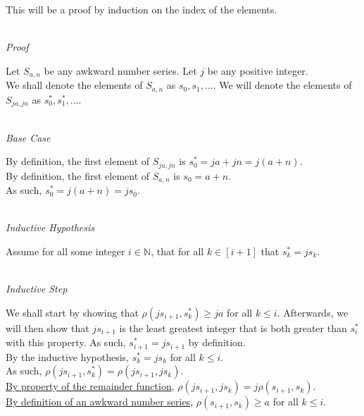 \documentclass[a4paper,12pt]{article}
\begin{document}
\noindent This will be a proof by induction on the index of the elements.

\noindent \\
\textit{Proof}

\noindent Let $S_{a,n}$ be any awkward number series. Let $j$ be any positive integer.\\

\noindent We shall denote the elements of $S_{a,n}$ as $s_0, s_1, ...$. We will denote the elements of $S_{ja, jn}$ as $s^*_0, s^*_1, ...$.

\noindent \\
\textit{Base Case}

\noindent By definition, the first element of $S_{ja, jn}$ is $s^*_0 = ja + jn = j(a + n)$.\\

\noindent By definition, the first element of $S_{a,n}$ is $s_0 = a + n$.\\

\noindent As such, $s^*_0 = j(a + n) = js_0$.



\noindent \\
\textit{Inductive Hypothesis}

\noindent Assume for all some integer $i \in \mathbb{N}$, that for all $k \in [i + 1]$ that $s^*_k = js_k$.


\noindent \\
\textit{Inductive Step}

\noindent We shall start by showing that $\rho(js_{i+1}, s^*_k) \geq ja$ for all $k \leq i$. Afterwards, we will then show that $js_{i+1}$ is the least greatest integer that is both greater than $s^*_i$ with this property. As such, $s^*_{i+1} = js_{i+1}$ by definition.\\

\noindent By the inductive hypothesis, $s^*_k = js_k$ for all $k \leq i$.\\

\noindent As such, $\rho(js_{i+1}, s^*_k) = \rho(js_{i+1}, js_k)$.\\

\noindent \hyperlink{remainder_properties}{By property of the remainder function}, $\rho(js_{i+1}, js_k) = j \rho(s_{i+1}, s_k)$.\\

\noindent \hyperlink{definition:awkward_number_series}{By definition of an awkward number series}, $\rho(s_{i+1}, s_k) \geq a$ for all $k \leq i$.\\
\end{document}
